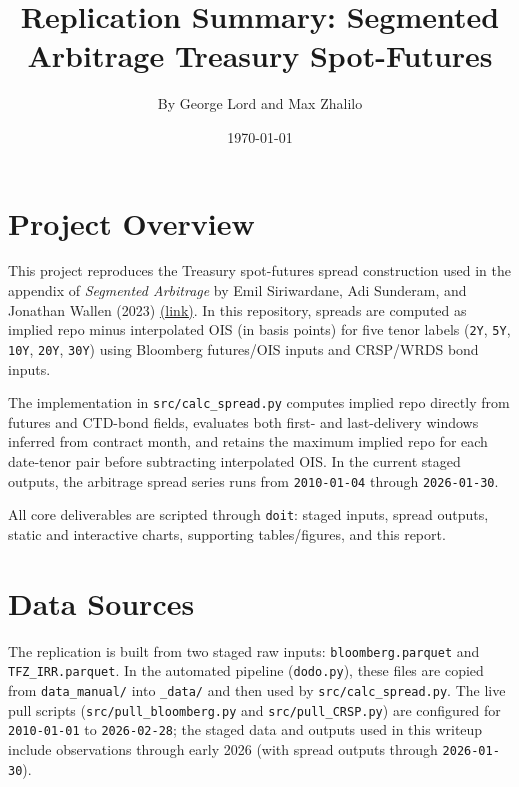 \documentclass[12pt]{article}
\title{Replication Summary: Segmented Arbitrage Treasury Spot-Futures}
\author{By George Lord and Max Zhalilo}
\date{\today}
\begin{document}
\maketitle
\onehalfspacing

\section{Project Overview}
This project reproduces the Treasury spot-futures spread construction used in the appendix of \textit{Segmented Arbitrage}
by Emil Siriwardane, Adi Sunderam, and Jonathan Wallen (2023) \href{https://www.hbs.edu/ris/Publication%20Files/24-030_1506d32b-3190-4144-8c75-a2326b87f81e.pdf}{(link)}.
In this repository, spreads are computed as implied repo minus interpolated OIS (in basis points) for five tenor labels
(\texttt{2Y}, \texttt{5Y}, \texttt{10Y}, \texttt{20Y}, \texttt{30Y}) using Bloomberg futures/OIS inputs and CRSP/WRDS bond inputs.

The implementation in \texttt{src/calc\_spread.py} computes implied repo directly from futures and CTD-bond fields, evaluates both first- and last-delivery windows inferred from contract month, and retains the maximum implied repo for each date-tenor pair before subtracting interpolated OIS. In the current staged outputs, the arbitrage spread series runs from \texttt{2010-01-04} through \texttt{2026-01-30}.

All core deliverables are scripted through \texttt{doit}: staged inputs, spread outputs, static and interactive charts, supporting tables/figures, and this report.

\section{Data Sources}
\noindent The replication is built from two staged raw inputs: \texttt{bloomberg.parquet} and
\texttt{TFZ\_IRR.parquet}. In the automated pipeline (\texttt{dodo.py}), these files are copied from
\texttt{data\_manual/} into \texttt{\_data/} and then used by \texttt{src/calc\_spread.py}. The live pull scripts
(\texttt{src/pull\_bloomberg.py} and \texttt{src/pull\_CRSP.py}) are configured for
\texttt{2010-01-01} to \texttt{2026-02-28}; the staged data and outputs used in this writeup include observations
through early 2026 (with spread outputs through \texttt{2026-01-30}).
\end{document}
